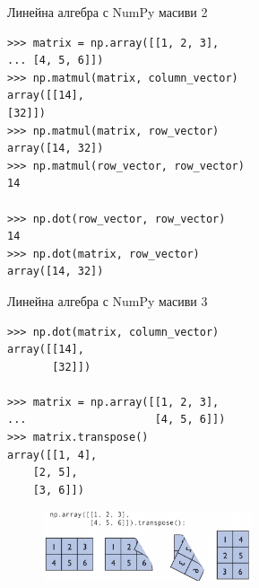 \documentclass{beamer}
\begin{document}
\begin{frame}[fragile]{Линейна алгебра с NumPy масиви 2 }

\begin{verbatim}
>>> matrix = np.array([[1, 2, 3],
... [4, 5, 6]])
>>> np.matmul(matrix, column_vector)
array([[14],
[32]])
>>> np.matmul(matrix, row_vector)
array([14, 32])
>>> np.matmul(row_vector, row_vector)
14

>>> np.dot(row_vector, row_vector)
14
>>> np.dot(matrix, row_vector)
array([14, 32])

\end{verbatim}
\end{frame}

\begin{frame}[fragile]{Линейна алгебра с NumPy масиви 3 }

\begin{verbatim}
>>> np.dot(matrix, column_vector)
array([[14],
       [32]])

>>> matrix = np.array([[1, 2, 3],
...                    [4, 5, 6]])
>>> matrix.transpose()
array([[1, 4],
    [2, 5],
    [3, 6]])
\end{verbatim}
\begin{figure}
    \centering
    \includegraphics[width=0.55\textwidth]{np9.png}
\end{figure}
\end{frame}
\end{document}
